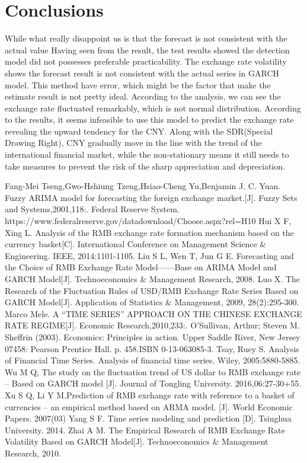 \documentclass[12pt, a4paper, titlepage]{article}
\begin{document}
\section{Conclusions}\label{conclusions}
While what really disappoint us is that the forecast is not consistent with the actual value
Having seen from the result, the test results showed the detection model did not possesses preferable practicability. The exchange rate volatility shows the forecast result is not consistent with the actual series in GARCH model.
This method have error, which might be the factor that make the estimate result is not pretty ideal. According to the analysis, we can see the exchange rate fluctuated remarkably, which is not normal distribution. According to the results, it seems infeasible to use this model to predict the exchange rate revealing the upward tendency for the CNY. Along with the SDR(Special Drawing Right), CNY gradually move in the line with the trend of the international financial market, while the non-stationary means it still needs to take measures to prevent the risk of the sharp appreciation and depreciation.\\


\begin{thebibliography}{9}
\bibitem{}  Fang-Mei Tseng,Gwo-Hshiung Tzeng,Hsiao-Cheng Yu,Benjamin J. C. Yuan. Fuzzy ARIMA model for forecasting the foreign exchange market.[J]. Fuzzy Sets and Systems,2001,118:.
\bibitem{}  Federal Reserve System. https://www.federalreserve.gov/datadownload/Choose.aspx?rel=H10 
\bibitem{}  Hui X F, Xing L. Analysis of the RMB exchange rate formation mechanism based on the currency basket[C]. International Conference on Management Science \& Engineering. IEEE, 2014:1101-1105. 
\bibitem{}  Liu S L, Wen T, Jun G E. Forecasting and the Choice of RMB Exchange Rate Model——Base on ARIMA Model and GARCH Model[J]. Technoeconomics \& Management Research, 2008.
\bibitem{}  Luo X. The Research of the Fluctuation Rules of USD/RMB Exchange Rate Series Based on GARCH Model[J]. Application of Statistics \& Management, 2009, 28(2):295-300.
\bibitem{}  Marco Mele. A “TIME SERIES” APPROACH ON THE CHINESE EXCHANGE RATE REGIME[J]. Economic Research,2010,233:.
\bibitem{}  O'Sullivan, Arthur; Steven M. Sheffrin (2003). Economics: Principles in action. Upper Saddle River, New Jersey 07458: Pearson Prentice Hall. p. 458.ISBN 0-13-063085-3. 
\bibitem{}  Tsay, Ruey S. Analysis of Financial Time Series. Analysis of financial time series. Wiley, 2005:5880-5885.
\bibitem{}  Wu M Q, The study on the fluctuation trend of US dollar to RMB exchange rate -- Based on GARCH model [J]. Journal of Tongling University. 2016,06:27-30+55.
\bibitem{}  Xu S Q, Li Y M.Prediction of RMB exchange rate with reference to a basket of currencies -- an empirical method based on ARMA model. [J]. World Economic Papers. 2007(03)
\bibitem{}  Yang S F. Time series modeling and prediction [D]. Tsinghua University. 2014.
\bibitem{}  Zhai A M. The Empirical Research of RMB Exchange Rate Volatility Based on GARCH Model[J]. Technoeconomics \& Management Research, 2010.
\end{thebibliography}
\end{document}
